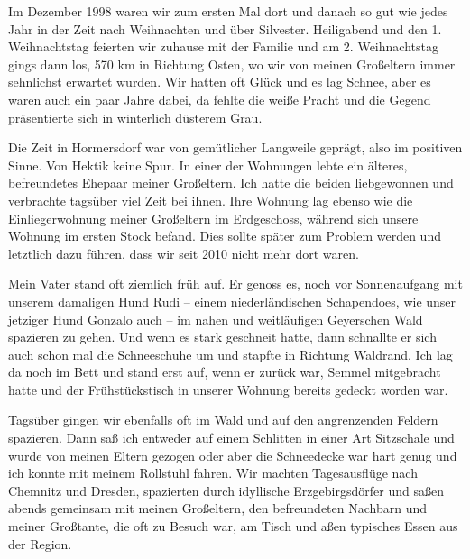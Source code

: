 \documentclass[fontsize=14pt,a4paper,headinclude,DIV=calc,automark]{scrbook}
\begin{document}
Im Dezember 1998 waren wir zum ersten Mal dort und danach so gut wie jedes Jahr in der Zeit nach Weihnachten und über Silvester. Heiligabend und den 1. Weihnachtstag feierten wir zuhause mit der Familie und am 2. Weihnachtstag gings dann los, 570 km in Richtung Osten, wo wir von meinen Großeltern immer sehnlichst erwartet wurden. Wir hatten oft Glück und es lag Schnee, aber es waren auch ein paar Jahre dabei, da fehlte die weiße Pracht und die Gegend präsentierte sich in winterlich düsterem Grau.

Die Zeit in Hormersdorf war von gemütlicher Langweile geprägt, also im positiven Sinne. Von Hektik keine Spur. In einer der Wohnungen lebte ein älteres, befreundetes Ehepaar meiner Großeltern. Ich hatte die beiden liebgewonnen und verbrachte tagsüber viel Zeit bei ihnen. Ihre Wohnung lag ebenso wie die Einliegerwohnung meiner Großeltern im Erdgeschoss, während sich unsere Wohnung im ersten Stock befand. Dies sollte später zum Problem werden und letztlich dazu führen, dass wir seit 2010 nicht mehr dort waren.

Mein Vater stand oft ziemlich früh auf. Er genoss es, noch vor Sonnenaufgang mit unserem damaligen Hund Rudi – einem niederländischen Schapendoes, wie unser jetziger Hund Gonzalo auch – im nahen und weitläufigen Geyerschen Wald spazieren zu gehen. Und wenn es stark geschneit hatte, dann schnallte er sich auch schon mal die Schneeschuhe um und stapfte in Richtung Waldrand. Ich lag da noch im Bett und stand erst auf, wenn er zurück war, Semmel mitgebracht hatte und der Frühstückstisch in unserer Wohnung bereits gedeckt worden war.

Tagsüber gingen wir ebenfalls oft im Wald und auf den angrenzenden Feldern spazieren. Dann saß ich entweder auf einem Schlitten in einer Art Sitzschale und wurde von meinen Eltern gezogen oder aber die Schneedecke war hart genug und ich konnte mit meinem Rollstuhl fahren. Wir machten Tagesausflüge nach Chemnitz und Dresden, spazierten durch idyllische Erzgebirgsdörfer und saßen abends gemeinsam mit meinen Großeltern, den befreundeten Nachbarn und meiner Großtante, die oft zu Besuch war, am Tisch und aßen typisches Essen aus der Region.
\end{document}
